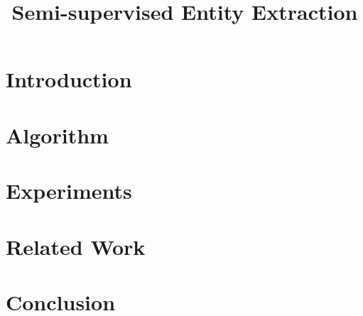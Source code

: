 \documentclass[11pt,a4paper]{article}
\title{Semi-supervised Entity Extraction}
\author{}
\date{}
\begin{document}
\maketitle

\begin{abstract}
\end{abstract}

\section{Introduction}


\section{Algorithm}


\section{Experiments}


\section{Related Work}


\section{Conclusion}




\end{document}
